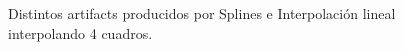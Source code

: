 \begin{figure}[H]
\centering
\begin{minipage}{0.31\textwidth}   

\end{minipage}
\hfill
\begin{minipage}{0.31\textwidth}   
\end{minipage}
\hfill
\begin{minipage}{0.31\textwidth}   
\end{minipage}
\caption{\footnotesize Distintos artifacts producidos por Splines e Interpolación lineal interpolando 4 cuadros.}

\label{fig:ff6}

\end{figure}

